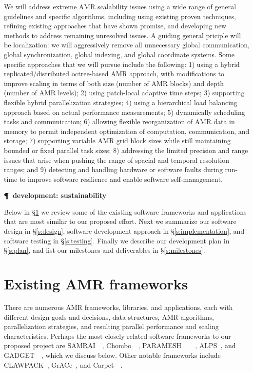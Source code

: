 \documentclass[11pt,letterpaper]{article}
\newcommand{\devel}[1]{\textbf{#1}}
\newcommand{\pargraph}[1]{\devel{\P\ \textbf{#1} \\}}
\newcommand{\chombo}{\textsf{Chombo}}
\newcommand{\samrai}{\textsf{SAMRAI}}
\newcommand{\paramesh}{\textsf{PARAMESH}}
\newcommand{\gadget}{\textsf{GADGET}}
\newcommand{\alps}{\textsf{ALPS}}
\newcommand{\clawpack}{\textsf{CLAWPACK}}
\newcommand{\grace}{\textsf{GrACe}}
\newcommand{\carpet}{\textsf{Carpet}}
\begin{document}
We will address extreme AMR scalability issues using a wide range of
general guidelines and specific algorithms, including using existing
proven techniques, refining existing approaches that have shown
promise, and developing new methods to address remaining unresolved
issues.  A guiding general priciple will be localization: we will
aggressively remove all unnecessary global communication, global
synchronization, global indexing, and global coordinate systems.  Some
specific approaches that we will pursue include the following:
%
1) using a hybrid replicated/distributed octree-based AMR approach, with
modifications to improve scaling in terms of both size (number of AMR
blocks) and depth (number of AMR levels);
% 
2) using patch-local adaptive time steps;
% 
3) supporting flexible hybrid parallelization strategies;
% 
4) using a hierarchical load balancing approach based on actual
performance measurements;
% 
5) dynamically scheduling tasks and communication;
% 
6) allowing flexible reorganization of AMR data in memory to permit
independent optimization of computation, communication, and storage;
% 
7) supporting variable AMR grid block sizes while still maintaining
bounded or fixed parallel task sizes;
% 
8) addressing the limited precision and range issues that arise when
pushing the range of spacial and temporal resolution ranges;
% 
and 9) detecting and handling hardware or software faults during
run-time to improve software resilience and enable software
self-management.

\pargraph{development: sustainability}

Below in \S\ref{s:review} we review some of the existing software
frameworks and applications that are most similar to our proposed
effort.  Next we summarize our software design in \S\ref{s:design}, software
development approach in \S\ref{s:implementation}, and software testing in
\S\ref{s:testing}.  Finally we describe our development plan in
\S\ref{s:plan}, and list our milestones and deliverables in
\S\ref{s:milestones}.

\section{Existing AMR frameworks} \label{s:review}

There are numerous AMR frameworks, libraries, and applications, each
with different design goals and decisions, data structures, AMR
algorithms, parallelization strategies, and resulting parallel
performance and scaling characteristics.  Perhaps the most closely
related software frameworks to our proposed project are
\samrai~\cite{WiHo01}~\cite{wwwsamraicode},
\chombo~\cite{wwwchombo}~\cite{CoGr09},
\paramesh~\cite{MaOl00}~\cite{OlMa05}~\cite{Ol06}~\cite{wwwparamesh},
\alps~\cite{BuBu09}, and \gadget~\cite{wwwgadget}~\cite{Sp05}, which
we discuss below.  Other notable frameworks include
\clawpack~\cite{wwwclawpack}, \grace~\cite{PaLi10}, and
\carpet~\cite{ScDi06}~\cite{wwwcarpet}.  
\end{document}
